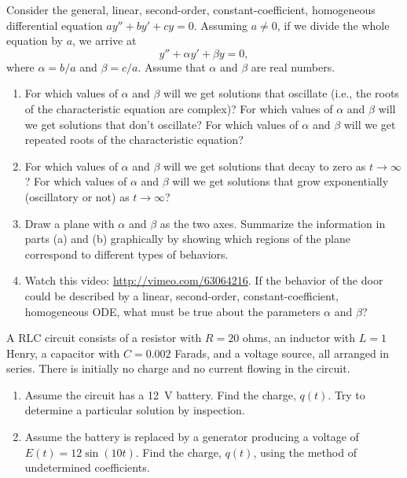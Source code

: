 \documentclass[12pt,letterpaper]{hmcpset}
\begin{document}

\begin{problem}[1]
    Consider the general, linear, second-order, constant-coefficient, homogeneous differential equation $ay''+by'+cy=0$.
    Assuming $a\neq 0$, if we divide the whole equation by $a$, we arrive at
    \[
        y''+\alpha y'+\beta y=0,
    \]
    where $\alpha=b/a$ and $\beta=c/a$. Assume that $\alpha$ and $\beta$ are real numbers.
    \begin{enumerate}
        \item For which values of $\alpha$ and $\beta$ will we get solutions that oscillate (i.e., the roots of the characteristic equation are complex)? For which values of $\alpha$ and $\beta$ will we get solutions that don't oscillate? For which values of $\alpha$ and $\beta$ will we get repeated roots of the characteristic equation?
        \item For which values of $\alpha$ and $\beta$ will we get solutions that decay to zero as $t\to\infty$? For which values of $\alpha$ and $\beta$ will we get solutions that grow exponentially (oscillatory or not) as $t\to\infty$?
        \item Draw a plane with $\alpha$ and $\beta$ as the two axes. Summarize the information in parts (a) and (b) graphically by showing which regions of the plane correspond to different types of behaviors.
        \item Watch this video: \url{http://vimeo.com/63064216}. If the behavior of the door could be described by a linear, second-order, constant-coefficient, homogeneous ODE, what must be true about the parameters $\alpha$ and $\beta$?
    \end{enumerate}
\end{problem}

\begin{solution}
    \vfill
\end{solution}
\newpage

\begin{problem}[2]
    A RLC circuit consists of a resistor with $R=20$ ohms, an inductor with $L= 1$ Henry, a capacitor with $C=0.002$ Farads, and a voltage source, all arranged in series. There is initially no charge and no current flowing in the circuit.
    \begin{enumerate}
        \item Assume the circuit has a 12~V battery.  Find the charge, $q(t)$. Try to determine a particular solution by inspection.
        \item Assume the battery is replaced by a generator producing a voltage of $E(t) = 12 \sin (10t)$.  Find the charge, $q(t)$, using the method of undetermined coefficients.
    \end{enumerate}
\end{problem}
\end{document}
